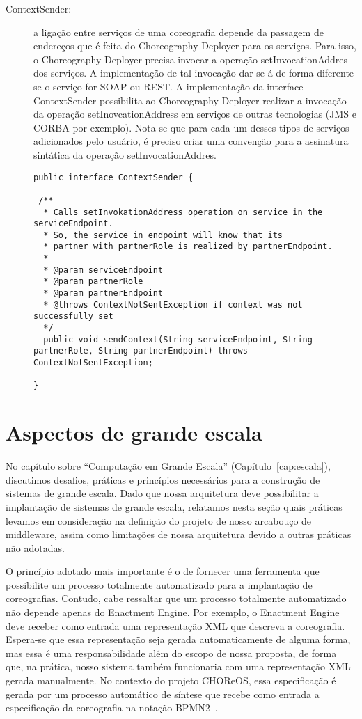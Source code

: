 \begin{description}
\item [ContextSender:] a ligação entre serviços de uma coreografia depende da passagem de endereços que é feita do Choreography Deployer para os serviços. Para isso, o Choreography Deployer precisa invocar a operação setInvocationAddres dos serviços. A implementação de tal invocação dar-se-á de forma diferente se o serviço for SOAP ou REST. A implementação da interface \textsf{ContextSender} possibilita ao Choreography Deployer realizar a invocação da operação setInovcationAddress em serviços de outras tecnologias (JMS e CORBA por exemplo). Nota-se que para cada um desses tipos de serviços adicionados pelo usuário, é preciso criar uma convenção para a assinatura sintática da operação setInvocationAddres.

\begin{lstlisting}[frame=trbl, label=lst:context_sender, caption=Interface ContextSender]
public interface ContextSender {
	
 /**
  * Calls setInvokationAddress operation on service in the serviceEndpoint.
  * So, the service in endpoint will know that its
  * partner with partnerRole is realized by partnerEndpoint.
  * 
  * @param serviceEndpoint
  * @param partnerRole
  * @param partnerEndpoint
  * @throws ContextNotSentException if context was not successfully set
  */
  public void sendContext(String serviceEndpoint, String partnerRole, String partnerEndpoint) throws ContextNotSentException;

}
\end{lstlisting}

\end{description}

\section{Aspectos de grande escala}
\label{sec:solucao_grande_escala}

No capítulo sobre ``Computação em Grande Escala'' (Capítulo~\ref{cap:escala}), discutimos desafios, práticas e princípios necessários para a construção de sistemas de grande escala. Dado que nossa arquitetura deve possibilitar a implantação de sistemas de grande escala, relatamos nesta seção quais práticas levamos em consideração na definição do projeto de nosso arcabouço de middleware, assim como limitações de nossa arquitetura devido a outras práticas não adotadas.

O princípio adotado mais importante é o de fornecer uma ferramenta que possibilite um processo totalmente automatizado para a implantação de coreografias. Contudo, cabe ressaltar que um processo totalmente automatizado não depende apenas do Enactment Engine. Por exemplo, o Enactment Engine deve receber como entrada uma representação XML que descreva a coreografia. Espera-se que essa representação seja gerada automaticamente de alguma forma, mas essa é uma responsabilidade além do escopo de nossa proposta, de forma que, na prática, nosso sistema também funcionaria com uma representação XML gerada manualmente. No contexto do projeto CHOReOS, essa especificação é gerada por um processo automático de síntese que recebe como entrada a especificação da coreografia na notação BPMN2~\cite{Autili2013Synthesis}.

